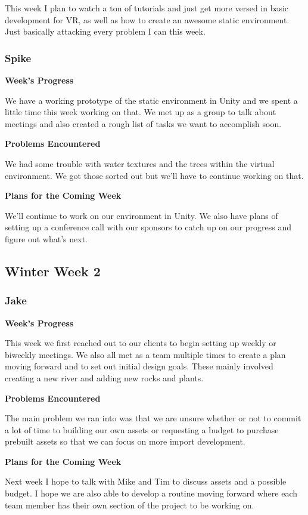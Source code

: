 \documentclass[10pt,journal,compsoc,onecolumn, draftclsnofoot]{IEEEtran}
\begin{document}
This week I plan to watch a ton of tutorials and just get more versed in basic development for VR, as well as how to create an awesome static environment. Just basically attacking every problem I can this week.

\subsubsection{Spike}
\noindent \textbf{Week's Progress}

We have a working prototype of the static environment in Unity and we spent a little time this week working on that. We met up as a group to talk about meetings and also created a rough list of tasks we want to accomplish soon.

\noindent \textbf{Problems Encountered}

We had some trouble with water textures and the trees within the virtual environment. We got those sorted out but we'll have to continue working on that.

\noindent \textbf{Plans for the Coming Week}

We'll continue to work on our environment in Unity. We also have plans of setting up a conference call with our sponsors to catch up on our progress and figure out what's next.

\subsection{Winter Week 2}
\subsubsection{Jake}
\noindent \textbf{Week's Progress}

This week we first reached out to our clients to begin setting up weekly or biweekly meetings. We also all met as a team multiple times to create a plan moving forward and to set out initial design goals. These mainly involved creating a new river and adding new rocks and plants.

\noindent \textbf{Problems Encountered}

The main problem we ran into was that we are unsure whether or not to commit a lot of time to building our own assets or requesting a budget to purchase prebuilt assets so that we can focus on more import development.

\noindent \textbf{Plans for the Coming Week}

Next week I hope to talk with Mike and Tim to discuss assets and a possible budget. I hope we are also able to develop a routine moving forward where each team member has their own section of the project to be working on.
\end{document}
